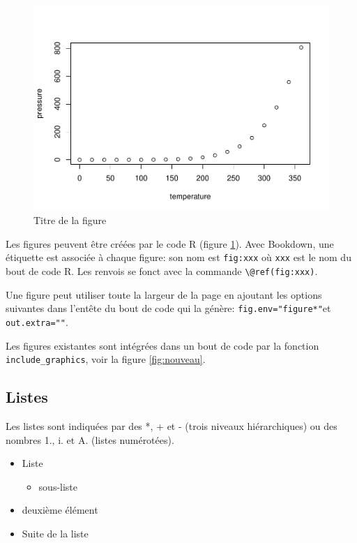 \documentclass[fleqn,10pt]{ArtEcoFoG} %
\providecommand{\tightlist}{%
  \setlength{\itemsep}{0pt}\setlength{\parskip}{0pt}}
\begin{document}
\begin{figure}
\centering
\includegraphics{Saucisson_files/figure-latex/pressure-1.pdf}
\caption{\label{fig:pressure}Titre de la figure}
\end{figure}

Les figures peuvent être créées par le code R (figure
\ref{fig:pressure}). Avec Bookdown, une étiquette est associée à chaque
figure: son nom est \texttt{fig:xxx} où \texttt{xxx} est le nom du bout
de code R. Les renvois se fonct avec la commande
\texttt{\textbackslash{}@ref(fig:xxx)}.

Une figure peut utiliser toute la largeur de la page en ajoutant les
options suivantes dans l'entête du bout de code qui la génère:
\texttt{fig.env="figure*"}et \texttt{out.extra=""}.

Les figures existantes sont intégrées dans un bout de code par la
fonction \texttt{include\_graphics}, voir la figure \ref{fig:nouveau}.

\subsection{Listes}\label{listes}

Les listes sont indiquées par des *, + et - (trois niveaux
hiérarchiques) ou des nombres 1., i. et A. (listes numérotées).

\begin{itemize}
\item
  Liste

  \begin{itemize}
  \tightlist
  \item
    sous-liste
  \end{itemize}
\item
  deuxième élément
\item
  Suite de la liste
\end{itemize}
\end{document}

